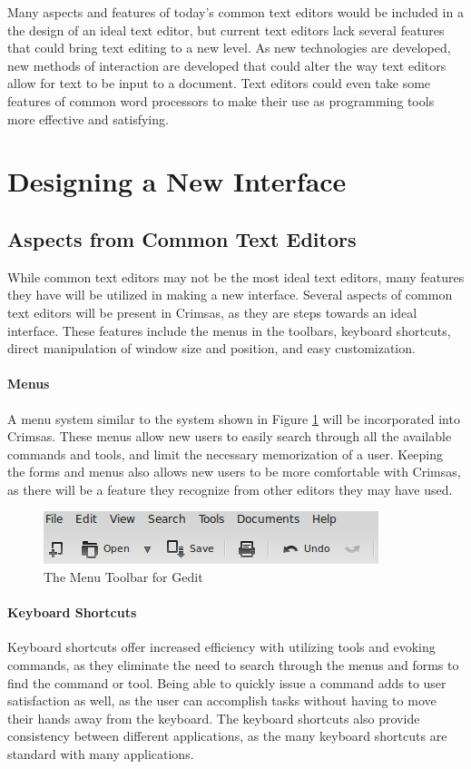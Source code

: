 \documentclass[11pt, oneside]{article}
\begin{document}
Many aspects and features of today's common text editors would be included in a the design of an ideal text editor, but current text editors lack several features that could bring text editing to a new level. As new technologies are developed, new methods of interaction are developed that could alter the way text editors allow for text to be input to a document. Text editors could even take some features of common word processors to make their use as programming tools more effective and satisfying. 

\section{Designing a New Interface}
\subsection{Aspects from Common Text Editors}
While common text editors may not be the most ideal text editors, many features they have will be utilized in making a new interface. Several aspects of common text editors will be present in Crimsas, as they are steps towards an ideal interface. These features include the menus in the toolbars, keyboard shortcuts, direct manipulation of window size and position, and easy customization. 

\paragraph{Menus}
A menu system similar to the system shown in Figure \ref{Gedit_menu} will be incorporated into Crimsas. These menus allow new users to easily search through all the available commands and tools, and limit the necessary memorization of a user. Keeping the forms and menus also allows new users to be more comfortable with Crimsas, as there will be a feature they recognize from other editors they may have used. 

\begin{figure}
    \centering
    \includegraphics[width=.8\textwidth]{photos/typical_menu.png}
    \caption{The Menu Toolbar for Gedit}
    \label{Gedit_menu}
\end{figure}

\paragraph{Keyboard Shortcuts}
Keyboard shortcuts offer increased efficiency with utilizing tools and evoking commands, as they eliminate the need to search through the menus and forms to find the command or tool. Being able to quickly issue a command adds to user satisfaction as well, as the user can accomplish tasks without having to move their hands away from the keyboard. The keyboard shortcuts also provide consistency between different applications, as the many keyboard shortcuts are standard with many applications.
\end{document}
